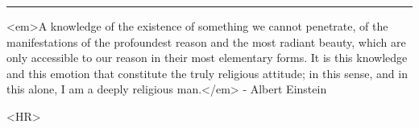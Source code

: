 \par\noindent\rule{\textwidth}{0.4pt}
<em>A knowledge of the existence of something we cannot penetrate, of the 
manifestations of the profoundest reason and the most radiant beauty, 
which are only accessible to our reason in their most elementary forms.
It is this knowledge and this emotion that constitute the truly religious
attitude; in this sense, and in this alone, I am a deeply religious man.</em>
- Albert Einstein


<HR>



